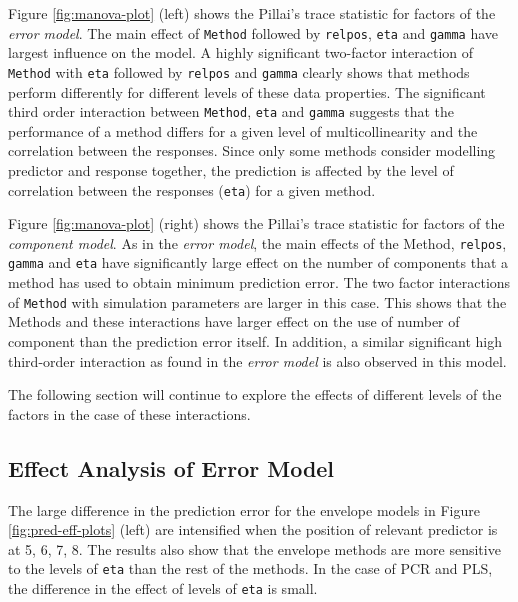 \documentclass[review]{elsarticle}
\providecommand{\tightlist}{%
  \setlength{\itemsep}{0pt}\setlength{\parskip}{0pt}}
\begin{document}
\begin{description}
\tightlist
\item[Error Model:]
Figure \ref{fig:manova-plot} (left) shows the Pillai's trace statistic
for factors of the \emph{error model}. The main effect of
\texttt{Method} followed by \texttt{relpos}, \texttt{eta} and
\texttt{gamma} have largest influence on the model. A highly significant
two-factor interaction of \texttt{Method} with \texttt{eta} followed by
\texttt{relpos} and \texttt{gamma} clearly shows that methods perform
differently for different levels of these data properties. The
significant third order interaction between \texttt{Method},
\texttt{eta} and \texttt{gamma} suggests that the performance of a
method differs for a given level of multicollinearity and the
correlation between the responses. Since only some methods consider
modelling predictor and response together, the prediction is affected by
the level of correlation between the responses (\texttt{eta}) for a
given method.
\item[Component Model:]
Figure \ref{fig:manova-plot} (right) shows the Pillai's trace statistic
for factors of the \emph{component model}. As in the \emph{error model},
the main effects of the Method, \texttt{relpos}, \texttt{gamma} and
\texttt{eta} have significantly large effect on the number of components
that a method has used to obtain minimum prediction error. The two
factor interactions of \texttt{Method} with simulation parameters are
larger in this case. This shows that the Methods and these interactions
have larger effect on the use of number of component than the prediction
error itself. In addition, a similar significant high third-order
interaction as found in the \emph{error model} is also observed in this
model.
\end{description}

The following section will continue to explore the effects of different
levels of the factors in the case of these interactions.

\subsection{Effect Analysis of Error
Model}\label{effect-analysis-of-error-model}

The large difference in the prediction error for the envelope models in
Figure \ref{fig:pred-eff-plots} (left) are intensified when the position
of relevant predictor is at 5, 6, 7, 8. The results also show that the
envelope methods are more sensitive to the levels of \texttt{eta} than
the rest of the methods. In the case of PCR and PLS, the difference in
the effect of levels of \texttt{eta} is small.
\end{document}
